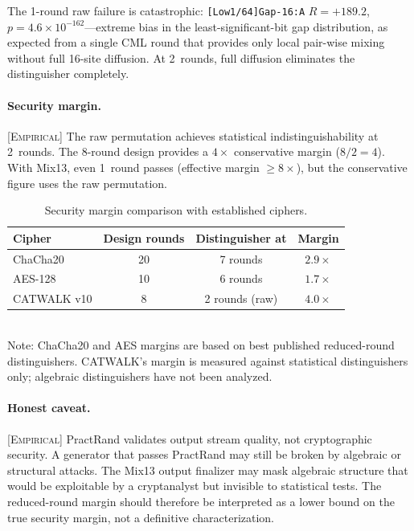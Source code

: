\documentclass[runningheads]{llncs}
\newcommand{\empirical}[1]{\textsc{[Empirical]} #1}
\begin{document}
The 1-round raw failure is catastrophic: \texttt{[Low1/64]Gap-16:A}
$R = +189.2$, $p = 4.6 \times 10^{-162}$---extreme bias in the
least-significant-bit gap distribution, as expected from a single CML round
that provides only local pair-wise mixing without full 16-site diffusion.
At 2~rounds, full diffusion eliminates the distinguisher completely.

\paragraph{Security margin.}
\empirical{The raw permutation achieves statistical indistinguishability at
2~rounds.  The 8-round design provides a $4\times$ conservative margin
($8/2 = 4$).}  With Mix13, even 1~round passes (effective margin $\geq 8\times$),
but the conservative figure uses the raw permutation.

\begin{table}[h]
\centering
\caption{Security margin comparison with established ciphers.}
\label{tab:margin-comparison}
\begin{tabular}{@{}lccc@{}}
\toprule
Cipher & Design rounds & Distinguisher at & Margin \\
\midrule
ChaCha20~\cite{bernstein2008chacha} & 20 & 7 rounds & $2.9\times$ \\
AES-128~\cite{daemen2001aes} & 10 & 6 rounds & $1.7\times$ \\
CATWALK v10 & 8 & 2 rounds (raw) & $4.0\times$ \\
\bottomrule
\end{tabular}
\\[4pt]
{\footnotesize Note: ChaCha20 and AES margins are based on best published
reduced-round distinguishers.  CATWALK's margin is measured against statistical
distinguishers only; algebraic distinguishers have not been analyzed.}
\end{table}

\paragraph{Honest caveat.}
\empirical{PractRand validates output stream quality, not cryptographic security.
A generator that passes PractRand may still be broken by algebraic or structural
attacks.  The Mix13 output finalizer may mask algebraic structure that would be
exploitable by a cryptanalyst but invisible to statistical tests.  The
reduced-round margin should therefore be interpreted as a lower bound on the
true security margin, not a definitive characterization.}
\end{document}
